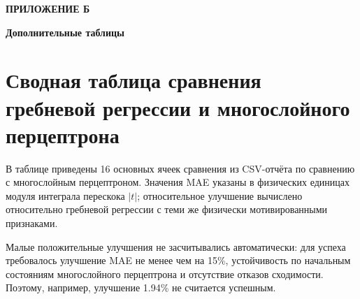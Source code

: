 \renewcommand{\thechapter}{Б}
\setcounter{chapter}{2}
\setcounter{section}{0}
\clearpage
\begin{flushright}
\textbf{ПРИЛОЖЕНИЕ Б}
\end{flushright}

\begin{center}
\textbf{Дополнительные таблицы}
\end{center}

\vspace{0.8cm}

\section{Сводная таблица сравнения гребневой регрессии и многослойного перцептрона}

В таблице приведены 16 основных ячеек сравнения из CSV-отчёта по сравнению с многослойным
перцептроном. Значения MAE указаны в физических единицах модуля интеграла перескока $|t|$;
относительное улучшение вычислено относительно гребневой регрессии с теми же физически
мотивированными признаками.

Малые положительные улучшения не засчитывались автоматически: для успеха требовалось
улучшение MAE не менее чем на 15\%, устойчивость по начальным состояниям многослойного
перцептрона и отсутствие отказов сходимости. Поэтому, например, улучшение 1.94\% не
считается успешным.

